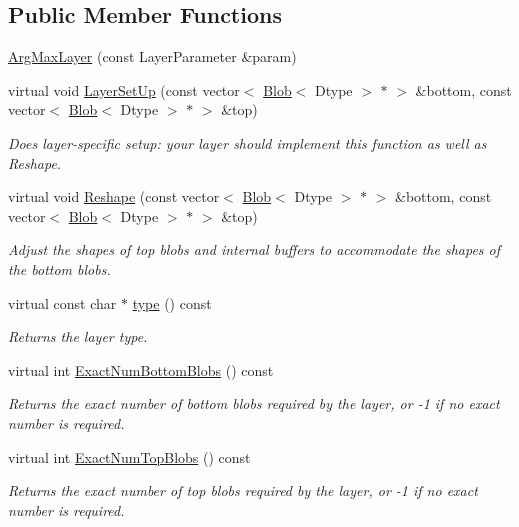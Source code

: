 \subsection*{Public Member Functions}
\begin{DoxyCompactItemize}
\item 
\hyperlink{classcaffe_1_1ArgMaxLayer_a77429601f3d7f27b48720a1b703491be}{Arg\+Max\+Layer} (const Layer\+Parameter \&param)
\item 
virtual void \hyperlink{classcaffe_1_1ArgMaxLayer_a479814976e31716e670d63c126e5036f}{Layer\+Set\+Up} (const vector$<$ \hyperlink{classcaffe_1_1Blob}{Blob}$<$ Dtype $>$ $\ast$ $>$ \&bottom, const vector$<$ \hyperlink{classcaffe_1_1Blob}{Blob}$<$ Dtype $>$ $\ast$ $>$ \&top)
\begin{DoxyCompactList}\small\item\em Does layer-\/specific setup\+: your layer should implement this function as well as Reshape. \end{DoxyCompactList}\item 
virtual void \hyperlink{classcaffe_1_1ArgMaxLayer_ac379771528cba5db5ebafe318c412f05}{Reshape} (const vector$<$ \hyperlink{classcaffe_1_1Blob}{Blob}$<$ Dtype $>$ $\ast$ $>$ \&bottom, const vector$<$ \hyperlink{classcaffe_1_1Blob}{Blob}$<$ Dtype $>$ $\ast$ $>$ \&top)
\begin{DoxyCompactList}\small\item\em Adjust the shapes of top blobs and internal buffers to accommodate the shapes of the bottom blobs. \end{DoxyCompactList}\item 
virtual const char $\ast$ \hyperlink{classcaffe_1_1ArgMaxLayer_af54ed9ab47e4e82c53d86768d3cbb691}{type} () const \hypertarget{classcaffe_1_1ArgMaxLayer_af54ed9ab47e4e82c53d86768d3cbb691}{}\label{classcaffe_1_1ArgMaxLayer_af54ed9ab47e4e82c53d86768d3cbb691}

\begin{DoxyCompactList}\small\item\em Returns the layer type. \end{DoxyCompactList}\item 
virtual int \hyperlink{classcaffe_1_1ArgMaxLayer_ab9acebe420760d367c6e5808842411d0}{Exact\+Num\+Bottom\+Blobs} () const 
\begin{DoxyCompactList}\small\item\em Returns the exact number of bottom blobs required by the layer, or -\/1 if no exact number is required. \end{DoxyCompactList}\item 
virtual int \hyperlink{classcaffe_1_1ArgMaxLayer_acb86bae0a6dd2f01688ed4575830b874}{Exact\+Num\+Top\+Blobs} () const 
\begin{DoxyCompactList}\small\item\em Returns the exact number of top blobs required by the layer, or -\/1 if no exact number is required. \end{DoxyCompactList}\end{DoxyCompactItemize}
